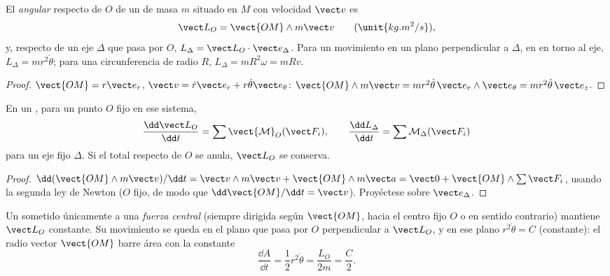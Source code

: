 \begin{definition}\label{def:b1:angular-momentum:L}
El \emph{ angular} respecto de $O$ de un  de masa $m$
situado en $M$ con velocidad $\vect v$ es
\[
\vect L_O = \vect{OM}\wedge m\vect v \qquad (\unit{kg.m^2/s}),
\]
y, respecto de un eje $\Delta$ que pasa por $O$, $L_\Delta = \vect L_O\cdot\vect e_\Delta$.
Para un movimiento en un plano perpendicular a $\Delta$, en  en torno al eje, $L_\Delta = mr^2\dot\theta$; para una
circunferencia de radio $R$, $L_\Delta = mR^2\omega = mRv$.
\end{definition}

\begin{proof}
$\vect{OM} = r\vect e_r$, $\vect v = \dot r\vect e_r + r\dot\theta\vect e_\theta$:
$\vect{OM}\wedge m\vect v = mr^2\dot\theta\,\vect e_r\wedge\vect e_\theta = mr^2\dot\theta\,\vect e_z$.
\end{proof}

\begin{theorem}\label{thm:b1:angular-momentum:theorem}
En un , para un punto $O$ fijo en ese sistema,
\[
\frac{\dd\vect L_O}{\dd t} = \sum\vect{\mathcal M}_O(\vect F_i),
\qquad
\frac{\dd L_\Delta}{\dd t} = \sum\mathcal M_\Delta(\vect F_i)
\]
para un eje fijo $\Delta$. Si el  total respecto de $O$ se anula,
$\vect L_O$ se conserva.
\end{theorem}

\begin{proof}
$\dd(\vect{OM}\wedge m\vect v)/\dd t = \vect v\wedge m\vect v + \vect{OM}\wedge m\vect a
= \vect 0 + \vect{OM}\wedge\sum\vect F_i$, usando la segunda ley de Newton
($O$ fijo, de modo que $\dd\vect{OM}/\dd t = \vect v$). Proyéctese sobre $\vect e_\Delta$.
\end{proof}

\begin{corollary}\label{cor:b1:angular-momentum:central}
Un  sometido únicamente a una \emph{fuerza central}
(siempre dirigida según $\vect{OM}$, hacia el centro fijo $O$ o en sentido
contrario) mantiene $\vect L_O$ constante. Su movimiento se queda en el
plano que pasa por $O$ perpendicular a $\vect L_O$, y en ese plano
$r^2\dot\theta = C$ (constante): el radio vector $\vect{OM}$ barre área
con la \emph{} constante
\[
\frac{\dd A}{\dd t} = \frac12 r^2\dot\theta = \frac{L_O}{2m} = \frac{C}{2} .
\]
\end{corollary}

